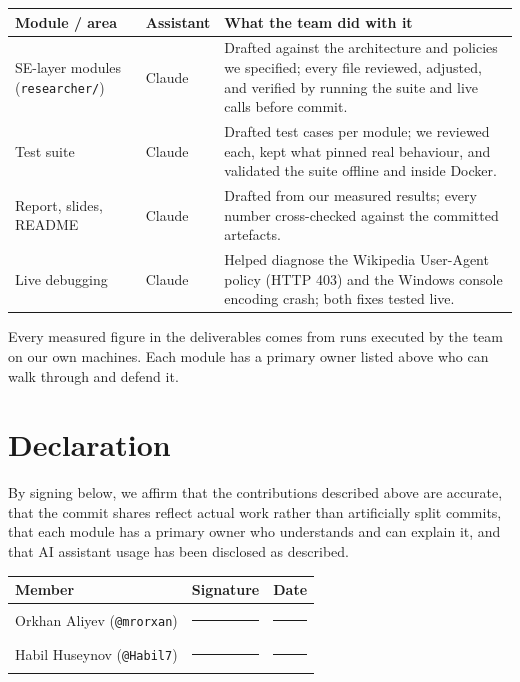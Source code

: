 \documentclass[11pt,a4paper]{article}
\begin{document}
\begin{center}
\begin{tabularx}{\textwidth}{@{}llX@{}}
\toprule
\textbf{Module / area} & \textbf{Assistant} & \textbf{What the team did with it} \\
\midrule
SE-layer modules (\texttt{researcher/}) & Claude & Drafted against the architecture and policies we specified; every file reviewed, adjusted, and verified by running the suite and live calls before commit. \\
Test suite & Claude & Drafted test cases per module; we reviewed each, kept what pinned real behaviour, and validated the suite offline and inside Docker. \\
Report, slides, README & Claude & Drafted from our measured results; every number cross-checked against the committed artefacts. \\
Live debugging & Claude & Helped diagnose the Wikipedia User-Agent policy (HTTP 403) and the Windows console encoding crash; both fixes tested live. \\
\bottomrule
\end{tabularx}
\end{center}

Every measured figure in the deliverables comes from runs executed by the team on our
own machines. Each module has a primary owner listed above who can walk through and
defend it.

\section{Declaration}

By signing below, we affirm that the contributions described above are accurate, that
the commit shares reflect actual work rather than artificially split commits, that each
module has a primary owner who understands and can explain it, and that AI assistant
usage has been disclosed as described.

\vspace{1.6em}
\begin{center}
\begin{tabularx}{0.92\textwidth}{@{}Xcc@{}}
\toprule
\textbf{Member} & \textbf{Signature} & \textbf{Date} \\
\midrule
\rule{0pt}{3.2em}Orkhan Aliyev (\texttt{@mrorxan}) & \rule{5cm}{0.4pt} & \rule{2.6cm}{0.4pt} \\
\rule{0pt}{3.2em}Habil Huseynov (\texttt{@Habil7}) & \rule{5cm}{0.4pt} & \rule{2.6cm}{0.4pt} \\
\bottomrule
\end{tabularx}
\end{center}
\end{document}

